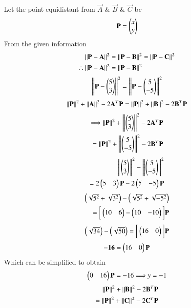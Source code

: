 \documentclass[journal,12pt,twocolumn]{IEEEtran}
\begin{document}
Let the point equidistant from $\Vec{A}$ \& $\Vec{B}$ \& $\Vec{C}$ be 
\begin{align}
    \Vec{P}=\myvec{x\\y}
\end{align}
From the given information 
\begin{align}
    \norm{\Vec{P}-\vec{A}}^2 &= \norm{\vec{P}-\vec{B}}^2 = \norm{\vec{P}-\vec{C}}^2\\
\therefore
    \norm{\Vec{P}-\vec{A}}^2 &= \norm{\vec{P}-\vec{B}}^2
\end{align}
\begin{align}
    \left\lVert\mathbf{P}-\begin{pmatrix}5\\3\end{pmatrix}\right\rVert^2 =\left\lVert\mathbf{P} - \begin{pmatrix}5\\-5\end{pmatrix}\right\rVert^2
    \end{align}
    \begin{align}
    \left\lVert\mathbf{P}\right\rVert^2 + \left\lVert\mathbf{A}\right\rVert^2 -2\mathbf{A}^T\mathbf{P} = \left\lVert\mathbf{P}\right\rVert^2 + \left\lVert\mathbf{B}\right\rVert^2 -2\mathbf{B}^T\mathbf{P}
\end{align}
\begin{align} 
    \Longrightarrow \left\lVert\mathbf{P}\right\rVert^2 + \left\lVert\begin{pmatrix}5\\3\end{pmatrix}\right\rVert^2 -2\mathbf{A}^T\mathbf{P}\\ = \left\lVert\mathbf{P}\right\rVert^2 + \left\lVert\begin{pmatrix}5\\-5\end{pmatrix}\right\rVert^2 -2\mathbf{B}^T\mathbf{P}
\end{align}
\begin{align}
    \left\lVert\begin{pmatrix}5\\3\end{pmatrix}\right\rVert^2 -\left\lVert\begin{pmatrix}5\\-5\end{pmatrix}\right\rVert^2 \\= 2\begin{pmatrix}5& 3\end{pmatrix}\mathbf{P} -2\begin{pmatrix}5&-5\end{pmatrix}\mathbf{P}
    \end{align}
    \begin{align}
    \begin{pmatrix}\sqrt{5^2}+\sqrt{3^2}\end{pmatrix} -\begin{pmatrix}\sqrt{5^2}+\sqrt{-5^2}\end{pmatrix} \\=                  \bigg[\begin{pmatrix}10&6\end{pmatrix} - \begin{pmatrix}10&-10\end{pmatrix}\bigg]\mathbf{P}
\end{align}
\begin{align}
    \begin{pmatrix}\sqrt{34}\end{pmatrix} -\begin{pmatrix}\sqrt{50}\end{pmatrix}                      =\bigg[\begin{pmatrix}16&0\end{pmatrix}\bigg]\mathbf{P}
\end{align}
\begin{align}
    \mathbf{-16} = \begin{pmatrix}16&0\end{pmatrix}\mathbf{P}
\end{align}
Which can be simplified to obtain 
\begin{align}
    \begin{pmatrix}0&16\end{pmatrix}\mathbf{P} = -16
    \Longrightarrow y = -1
\end{align}
\begin{align}
    \left\lVert\mathbf{P}\right\rVert^2 + \left\lVert\mathbf{B}\right\rVert^2 -2\mathbf{B}^T\mathbf{P} \\= \left\lVert\mathbf{P}\right\rVert^2 + \left\lVert\mathbf{C}\right\rVert^2 -2\mathbf{C}^T\mathbf{P}
\end{align}
\end{document}
